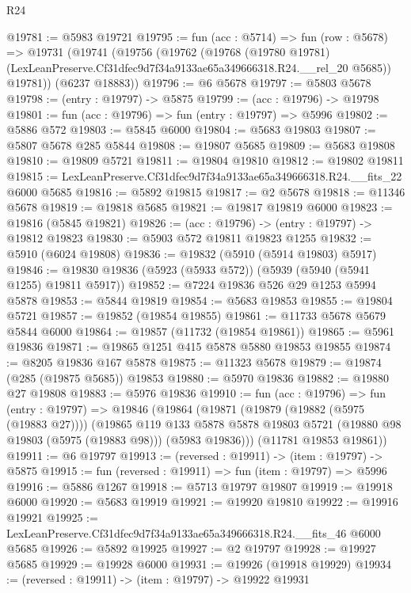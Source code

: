 \begin{lexlean}{R24}
\begin{coremodule}
@19781 := @5983 @19721
@19795 := fun (acc : @5714) =>
  fun (row : @5678) =>
  @19731
    (@19741
      (@19756
        (@19762
          (@19768
            (@19780 @19781)
            (LexLeanPreserve.Cf31dfec9d7f34a9133ae65a349666318.R24.__rel_20 @5685))
          @19781))
      (@6237 @18883))
@19796 := @6 @5678
@19797 := @5803 @5678
@19798 := (entry : @19797) -> @5875
@19799 := (acc : @19796) -> @19798
@19801 := fun (acc : @19796) => fun (entry : @19797) => @5996
@19802 := @5886 @572
@19803 := @5845 @6000
@19804 := @5683 @19803
@19807 := @5807 @5678 @285 @5844
@19808 := @19807 @5685
@19809 := @5683 @19808
@19810 := @19809 @5721
@19811 := @19804 @19810
@19812 := @19802 @19811
@19815 := LexLeanPreserve.Cf31dfec9d7f34a9133ae65a349666318.R24.__fits_22 @6000 @5685
@19816 := @5892 @19815
@19817 := @2 @5678
@19818 := @11346 @5678
@19819 := @19818 @5685
@19821 := @19817 @19819 @6000
@19823 := @19816 (@5845 @19821)
@19826 := (acc : @19796) -> (entry : @19797) -> @19812 @19823
@19830 := @5903 @572 @19811 @19823 @1255
@19832 := @5910 (@6024 @19808)
@19836 := @19832 (@5910 (@5914 @19803) @5917)
@19846 := @19830 @19836 (@5923 (@5933 @572)) (@5939 (@5940 (@5941 @1255) @19811 @5917))
@19852 := @7224 @19836 @526 @29 @1253 @5994 @5878
@19853 := @5844 @19819
@19854 := @5683 @19853
@19855 := @19804 @5721
@19857 := @19852 (@19854 @19855)
@19861 := @11733 @5678 @5679 @5844 @6000
@19864 := @19857 (@11732 (@19854 @19861))
@19865 := @5961 @19836
@19871 := @19865 @1251 @415 @5878 @5880 @19853 @19855
@19874 := @8205 @19836 @167 @5878
@19875 := @11323 @5678
@19879 := @19874 (@285 (@19875 @5685)) @19853
@19880 := @5970 @19836
@19882 := @19880 @27 @19808
@19883 := @5976 @19836
@19910 := fun (acc : @19796) =>
  fun (entry : @19797) =>
  @19846
    (@19864
      (@19871
        (@19879 (@19882 (@5975 (@19883 @27))))
        (@19865
          @119
          @133
          @5878
          @5878
          @19803
          @5721
          (@19880 @98 @19803 (@5975 (@19883 @98)))
          (@5983 @19836)))
      (@11781 @19853 @19861))
@19911 := @6 @19797
@19913 := (reversed : @19911) -> (item : @19797) -> @5875
@19915 := fun (reversed : @19911) => fun (item : @19797) => @5996
@19916 := @5886 @1267
@19918 := @5713 @19797 @19807
@19919 := @19918 @6000
@19920 := @5683 @19919
@19921 := @19920 @19810
@19922 := @19916 @19921
@19925 := LexLeanPreserve.Cf31dfec9d7f34a9133ae65a349666318.R24.__fits_46 @6000 @5685
@19926 := @5892 @19925
@19927 := @2 @19797
@19928 := @19927 @5685
@19929 := @19928 @6000
@19931 := @19926 (@19918 @19929)
@19934 := (reversed : @19911) -> (item : @19797) -> @19922 @19931

\end{coremodule}
\end{lexlean}
